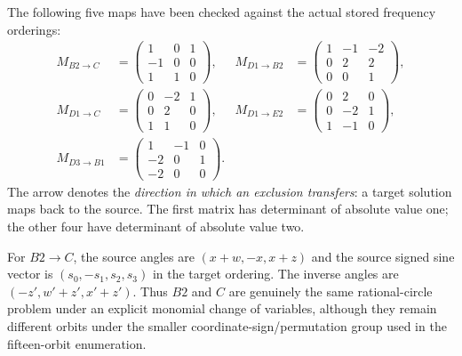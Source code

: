 \documentclass[11pt,letterpaper]{article}
\theoremstyle{definition}\newtheorem{definition}[theorem]{Definition}
\theoremstyle{remark}\newtheorem{remark}[theorem]{Remark}
\begin{document}
The following five maps have been checked against the actual stored frequency orderings:
\begin{align*}
 M_{B2\to C}&=\begin{pmatrix}1&0&1\\-1&0&0\\1&1&0\end{pmatrix},&
 M_{D1\to B2}&=\begin{pmatrix}1&-1&-2\\0&2&2\\0&0&1\end{pmatrix},\\[3pt]
 M_{D1\to C}&=\begin{pmatrix}0&-2&1\\0&2&0\\1&1&0\end{pmatrix},&
 M_{D1\to E2}&=\begin{pmatrix}0&2&0\\0&-2&1\\1&-1&0\end{pmatrix},\\[3pt]
 M_{D3\to B1}&=\begin{pmatrix}1&-1&0\\-2&0&1\\-2&0&0\end{pmatrix}.&&
\end{align*}
The arrow denotes the \emph{direction in which an exclusion transfers}: a target solution maps back to the source. The first matrix has determinant of absolute value one; the other four have determinant of absolute value two.

For $B2\to C$, the source angles are $(x+w,-x,x+z)$ and the source signed sine vector is $(s_0,-s_1,s_2,s_3)$ in the target ordering. The inverse angles are $(-z',w'+z',x'+z')$. Thus $B2$ and $C$ are genuinely the same rational-circle problem under an explicit monomial change of variables, although they remain different orbits under the smaller coordinate-sign/permutation group used in the fifteen-orbit enumeration.
\end{document}
